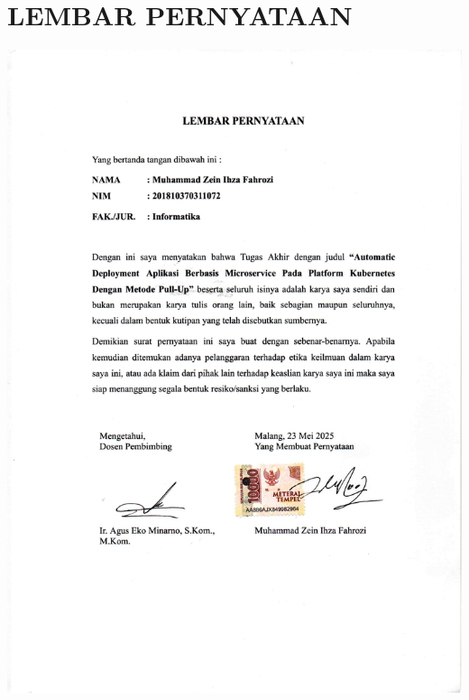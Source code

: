 \chapter*{\uppercase{LEMBAR PERNYATAAN}}

\begin{center}
    \includegraphics[width=\textwidth,page=1]{misc/lembar-pernyataan-scan.pdf}
\end{center}

\newpage
